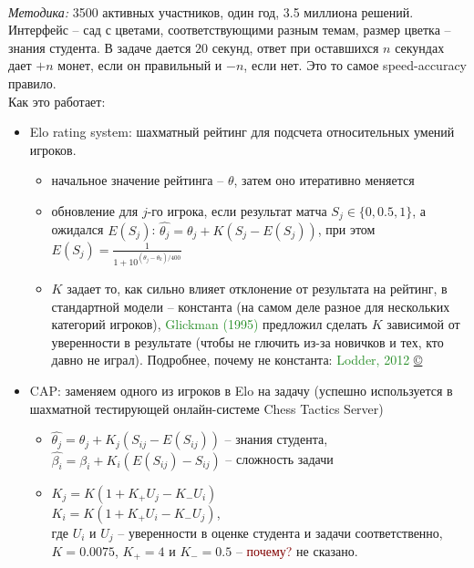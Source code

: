 \documentclass[12pt]{article}
\begin{document}
\bigskip\\\indent\textit{\Large Методика:}
    3500 активных участников, один год, 3.5 миллиона решений. Интерфейс -- сад с цветами, соответствующими разным темам, размер цветка -- знания студента. В задаче дается $20$ секунд, ответ при оставшихся $n$ секундах дает $+n$ монет, если он правильный и $-n$, если нет. Это то самое speed-accuracy правило.
    \\\indent Как это работает:
    \begin{itemize}
        \item Elo rating system: шахматный рейтинг для подсчета относительных умений игроков.
            \begin{itemize}
                \item начальное значение рейтинга -- $\theta$, затем оно итеративно меняется
                \item обновление для $j$-го игрока, если результат матча $S_j \in \{0, 0.5, 1\}$, а ожидался $E(S_j)$: $\hat{\theta_j} = \theta_j + K(S_j - E(S_j))$, при этом $E(S_j) = \frac{1}{1 + 10 ^ {(\theta_j - \theta_k) / 400}}$
                \item $K$ задает то, как сильно влияет отклонение от результата на рейтинг, в стандартной модели -- константа (на самом деле разное для нескольких категорий игроков), \textcolor{ForestGreen}{Glickman (1995)} предложил сделать $K$ зависимой от уверенности в результате (чтобы не глючить из-за новичков и тех, кто давно не играл). Подробнее, почему не константа: \textcolor{ForestGreen}{Lodder, 2012} \href{https://drive.google.com/open?id=0BwdzQv8PTtSZRmhpQ3NpM1FRYWs}{\copyright}
            \end{itemize}
        \item CAP: заменяем одного из игроков в Elo на задачу (успешно используется в шахматной тестирующей онлайн-системе Chess Tactics Server)
            \begin{itemize}
                \item  $\hat{\theta_j} = \theta_j + K_j(S_{ij} - E(S_{ij}))$ -- знания студента, \\ $\hat{\beta_i} = \beta_i + K_i(E(S_{ij}) - S_{ij})$ -- сложность задачи
                \item $K_j = K(1 + K_+ U_j - K_- U_i)$ \\ $K_i = K(1 + K_+ U_i - K_- U_j)$, \\
                где $U_i$ и $U_j$ -- уверенности в оценке студента и задачи соответственно, \\ $K = 0.0075$, $K_+ = 4$ и $K_- = 0.5$ -- \textcolor{Maroon}{почему?} не сказано.

\end{itemize}
\end{itemize}
\end{document}
